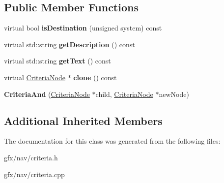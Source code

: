 \subsection*{Public Member Functions}
\begin{DoxyCompactItemize}
\item 
virtual bool {\bfseries is\+Destination} (unsigned system) const \hypertarget{classCriteriaAnd_a6d27daf5fc14716f90b90f83ff87754c}{}\label{classCriteriaAnd_a6d27daf5fc14716f90b90f83ff87754c}

\item 
virtual std\+::string {\bfseries get\+Description} () const \hypertarget{classCriteriaAnd_a40f1a9a59fd0b3ad40378d3094040171}{}\label{classCriteriaAnd_a40f1a9a59fd0b3ad40378d3094040171}

\item 
virtual std\+::string {\bfseries get\+Text} () const \hypertarget{classCriteriaAnd_ab8f7ee15479dbbad0854c60239d0b8db}{}\label{classCriteriaAnd_ab8f7ee15479dbbad0854c60239d0b8db}

\item 
virtual \hyperlink{classCriteriaNode}{Criteria\+Node} $\ast$ {\bfseries clone} () const \hypertarget{classCriteriaAnd_a6ab3bda77f413aebf86a2e7cc28eb1a0}{}\label{classCriteriaAnd_a6ab3bda77f413aebf86a2e7cc28eb1a0}

\item 
{\bfseries Criteria\+And} (\hyperlink{classCriteriaNode}{Criteria\+Node} $\ast$child, \hyperlink{classCriteriaNode}{Criteria\+Node} $\ast$new\+Node)\hypertarget{classCriteriaAnd_a7ee1eb959e125dcaf1f4fd1dc11fe7e6}{}\label{classCriteriaAnd_a7ee1eb959e125dcaf1f4fd1dc11fe7e6}

\end{DoxyCompactItemize}
\subsection*{Additional Inherited Members}


The documentation for this class was generated from the following files\+:\begin{DoxyCompactItemize}
\item 
gfx/nav/criteria.\+h\item 
gfx/nav/criteria.\+cpp\end{DoxyCompactItemize}
